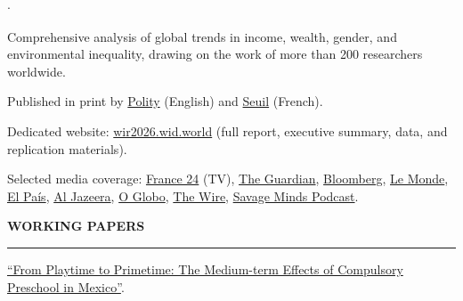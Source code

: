 \documentclass[11pt,letterpaper]{article}
\renewcommand{\section}[1]{%
  \vspace{0.8em}%
  {\large\bfseries\MakeUppercase{#1}}%
  \vspace{0.3em}%
  \hrule%
  \vspace{0.4em}%
}
\newenvironment{citemize}{%
  \begin{list}{$\cdot$}{%
    \setlength{\leftmargin}{1.5em}%
    \setlength{\itemsep}{0pt}%
    \setlength{\parsep}{0pt}%
    \setlength{\topsep}{0.2em}%
    \setlength{\partopsep}{0pt}%
  }%
}{%
  \end{list}%
}
\begin{document}
\begin{citemize}
  \item Comprehensive analysis of global trends in income, wealth, gender, and environmental inequality, drawing on the work of more than 200 researchers worldwide.
  \item Published in print by \href{https://www.politybooks.com/bookdetail?book\_slug=world-inequality-report-2026--9781509574865}{Polity} (English) and \href{https://www.seuil.com/ouvrage/rapport-sur-les-inegalites-mondiales-2026-lucas-chancel/9782021619676}{Seuil} (French).
  \item Dedicated website: \href{https://wir2026.wid.world/}{wir2026.wid.world} (full report, executive summary, data, and replication materials).
  \item Selected media coverage: \href{https://www.youtube.com/watch?v=WhPHuAA-d0Q}{France 24} (TV), \href{https://www.theguardian.com/inequality/2025/dec/10/just-0001-hold-three-times-the-wealth-of-poorest-half-of-humanity-report-finds}{The Guardian}, \href{https://www.bloomberg.com/news/articles/2025-12-09/world-s-rich-own-triple-the-wealth-of-poorest-half-study-finds}{Bloomberg}, \href{https://www.lemonde.fr/economie/article/2025/12/09/ces-ultrariches-qui-aspirent-une-part-croissante-de-la-richesse-mondiale\_6656576\_3234.html}{Le Monde}, \href{https://elpais.com/economia/2025-12-10/la-brecha-mundial-de-la-desigualdad-se-agranda-el-10-de-la-poblacion-concentra-el-75-del-patrimonio.html}{El Pa\'{i}s}, \href{https://www.aljazeera.com/news/2025/12/10/where-in-the-world-are-wealth-and-income-most-unequal}{Al Jazeera}, \href{https://oglobo.globo.com/economia/noticia/2025/12/09/fatia-dos-10percent-mais-ricos-detem-75percent-da-riqueza-global-e-metade-mais-pobre-fica-com-apenas-2percent-mostra-estudo.ghtml}{O Globo}, \href{https://m.thewire.in/article/political-economy/in-charts-world-inequality-report-2026/amp}{The Wire}, \href{https://savageminds.substack.com/p/ricardo-gomez-carrera}{Savage Minds Podcast}.
\end{citemize}


\section{Working Papers}

\href{https://ricardogomezcarrera.com/research/working\_papers/Gomez-Carrera%20R.%20%E2%80%93%20From%20Playtime%20to%20Primetime.pdf}{``From Playtime to Primetime: The Medium-term Effects of Compulsory Preschool in Mexico''}.
\end{document}
